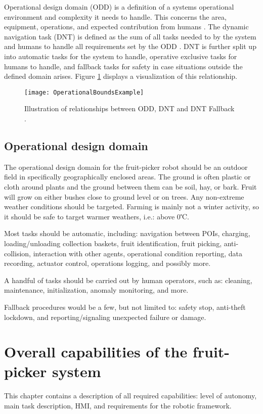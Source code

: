 \documentclass[%
oneside,    %
project,    %
nosummary   %
]{USN-MSc}
\begin{document}
Operational design domain (ODD) is a definition of a systems operational environment and complexity it needs to handle. This concerns the area, equipment, operations, and expected contribution from humans \cite{norwegiandefinitions}. The dynamic navigation task (DNT) is defined as the sum of all tasks needed to by the system and humans to handle all requirements set by the ODD \cite{norwegiandefinitions}. DNT is further split up into automatic tasks for the system to handle, operative exclusive tasks for humans to handle, and fallback tasks for safety in case situations outside the defined domain arises. Figure \ref{fig:OpBoundsEx} displays a visualization of this relationship.

\begin{figure}[!ht]
  \centering
  \texttt{[image: OperationalBoundsExample]}
  \caption{Illustration of relationships between ODD, DNT and DNT Fallback \cite{norwegiandefinitions}.}
  \label{fig:OpBoundsEx}
\end{figure}

\section{Operational design domain}
The operational design domain for the fruit-picker robot should be an outdoor field in specifically geographically enclosed areas. The ground is often plastic or cloth around plants and the ground between them can be soil, hay, or bark. Fruit will grow on either bushes close to ground level or on trees. Any non-extreme weather conditions should be targeted. Farming is mainly not a winter activity, so it should be safe to target warmer weathers, i.e.: above 0℃.

Most tasks should be automatic, including: navigation between POIs, charging, loading/unloading collection baskets, fruit identification, fruit picking, anti-collision, interaction with other agents, operational condition reporting, data recording, actuator control, operations logging, and possibly more.

A handful of tasks should be carried out by human operators, such as: cleaning, maintenance, initialization, anomaly monitoring, and more.

Fallback procedures would be a few, but not limited to: safety stop, anti-theft lockdown, and reporting/signaling unexpected failure or damage.

\chapter{Overall capabilities of the fruit-picker system}
\label{ch:overalCap}
This chapter contains a description of all required capabilities: level of autonomy, main task description, HMI, and requirements for the robotic framework.
\end{document}
